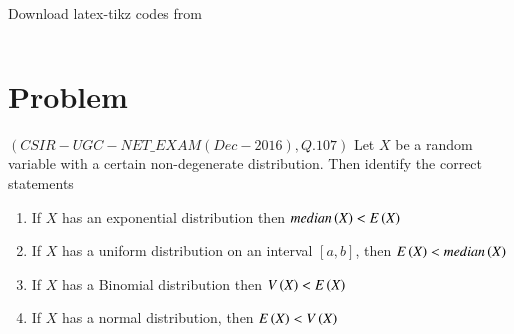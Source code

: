 \documentclass[journal,12pt,twocolumn]{IEEEtran}
\begin{document}
Download latex-tikz codes from
\begin{lstlisting}

\end{lstlisting}

\section{Problem}

$(CSIR-UGC-NET\_EXAM (Dec-2016), Q.107)$ Let $X$ be a random variable with a certain non-degenerate distribution. Then identify the correct statements
\begin{enumerate}[1.]
    \item If $X$ has an exponential distribution then $median\left(X\right)<E\left(X\right)$
    \item If $X$ has a uniform distribution on an interval $[a,b]$, then $E\left(X\right)<median\left(X\right)$
    \item If $X$ has a Binomial distribution then $V\left(X\right)<E\left(X\right)$
    \item If $X$ has a normal distribution, then $E\left(X\right)<V\left(X\right)$
\end{enumerate}
\end{document}
